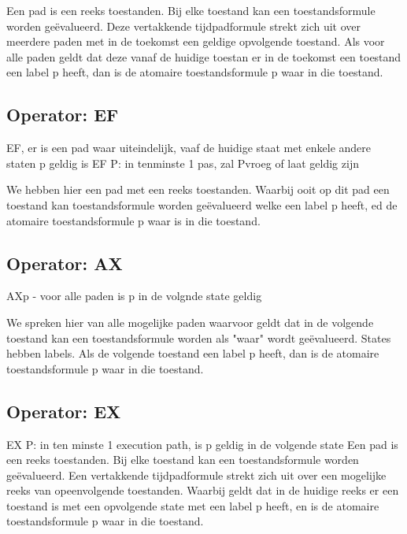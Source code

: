 \documentclass{article}
\begin{document}
	Een pad is een reeks toestanden. Bij elke toestand kan een toestandsformule worden geëvalueerd. Deze vertakkende tijdpadformule strekt zich uit over meerdere paden met in de toekomst een geldige  opvolgende  toestand.
	Als voor alle paden geldt dat deze vanaf de huidige toestan er in  de toekomst een toestand een label p heeft, dan is de atomaire toestandsformule p waar in die toestand.
	
	
	\subsection{Operator: EF}
	EF, er is een pad waar uiteindelijk, vaaf de huidige staat  met enkele andere staten p geldig is
	EF P: in tenminste 1 pas, zal Pvroeg of laat geldig zijn
	
	We hebben hier een pad met een reeks toestanden. Waarbij ooit op dit pad een toestand kan  toestandsformule worden geëvalueerd welke  een label p heeft,  ed de atomaire toestandsformule p waar is in die toestand.
	\subsection{Operator: AX}
	AXp - voor alle paden is p in de volgnde state geldig
	
	
	We spreken hier van alle mogelijke paden waarvoor geldt dat in de volgende toestand kan een toestandsformule worden als "waar" wordt geëvalueerd. 
	States hebben labels. Als de volgende toestand een label p heeft, dan is de atomaire toestandsformule p waar in die toestand.
	\subsection{Operator: EX}
	EX P: in ten minste 1 execution path, is p geldig in de volgende state	
	Een pad is een reeks toestanden. Bij elke toestand kan een toestandsformule worden geëvalueerd. Een vertakkende tijdpadformule strekt zich uit over een  mogelijke reeks van opeenvolgende toestanden.
	Waarbij geldt dat in de huidige reeks er een toestand is met een opvolgende state met een label p heeft, en is de atomaire toestandsformule p waar in die toestand.
\end{document}
